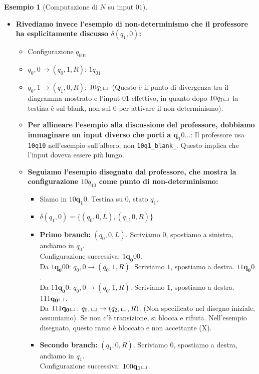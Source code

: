 \documentclass[a4paper]{article}
\theoremstyle{definition} %
\newtheorem{example}{Esempio}
\newcommand{\blankS}{\ensuremath{\raisebox{-0.15ex}{\scalebox{1.3}[0.7]{$\sqcup$}}\mkern2mu}}
\begin{document}
\begin{example}[Computazione di $N$ su input $01$]
\begin{enumerate}
\begin{itemize}
        \item \textbf{Rivediamo invece l'esempio di non-determinismo che il professore ha esplicitamente discusso $\delta(q_1,0)$:}
        \begin{itemize}
            \item Configurazione $q_001$
            \item $q_0,0 \to (q_0,1,R)$: $1q_01$
            \item $q_0,1 \to (q_1,0,R)$: $10q_1\blankS$ (Questo è il punto di divergenza tra il diagramma mostrato e l'input $01$ effettivo, in quanto dopo $10q_1\blankS$ la testina è sul blank, non sul $0$ per attivare il non-determinismo).
            \item \textbf{Per allineare l'esempio alla discussione del professore, dobbiamo immaginare un input diverso che porti a $\mathbf{q_1}0...$}: Il professore usa \texttt{10q10} nell'esempio sull'albero, non \texttt{10q1\_blank\_}. Questo implica che l'input doveva essere più lungo.
            \item \textbf{Seguiamo l'esempio disegnato dal professore, che mostra la configurazione $10q_10$ come punto di non-determinismo:}
            \begin{itemize}
                \item Siamo in $10\mathbf{q_1}0$. Testina su $0$, stato $q_1$.
                \item $\delta(q_1, 0) = \{ (q_0, 0, L), (q_1, 0, R) \}$
                \item \textbf{Primo branch:} $(q_0, 0, L)$. Scriviamo $0$, spostiamo a sinistra, andiamo in $q_0$.\\
                Configurazione successiva: $1\mathbf{q_0}00$.\\
                Da $1\mathbf{q_0}00$: $q_0,0 \to (q_0,1,R)$. Scriviamo $1$, spostiamo a destra. $11\mathbf{q_0}0$.\\
                Da $11\mathbf{q_0}0$: $q_0,0 \to (q_0,1,R)$. Scriviamo $1$, spostiamo a destra. $111\mathbf{q_0}\blankS$.\\
                Da $111\mathbf{q_0}\blankS$: $q_0,\blankS \to (q_2,\blankS,R)$. (Non specificato nel disegno iniziale, assumiamo). Se non c'è transizione, si blocca e rifiuta. Nell'esempio disegnato, questo ramo è bloccato e non accettante (X).
                \item \textbf{Secondo branch:} $(q_1, 0, R)$. Scriviamo $0$, spostiamo a destra, andiamo in $q_1$.\\
                Configurazione successiva: $100\mathbf{q_1}\blankS$.\\

\end{itemize}
\end{itemize}
\end{itemize}
\end{enumerate}
\end{example}
\end{document}
